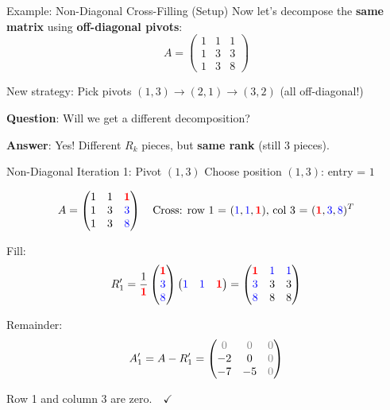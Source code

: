 \documentclass[10pt]{beamer}
\theoremstyle{definition}
\newcommand{\pvt}[1]{{\color{red}\mathbf{#1}}}       %
\newcommand{\crs}[1]{{\color{blue}#1}}                %
\newcommand{\rem}[1]{{\color{gray}#1}}                %
\newcommand{\x}[1]{\alert{\textbf{#1}}}
\begin{document}
\begin{frame}{Example: Non-Diagonal Cross-Filling (Setup)}
Now let's decompose the \x{same matrix} using \x{off-diagonal pivots}:
$$A = \begin{pmatrix}
1 & 1 & 1 \\
1 & 3 & 3 \\
1 & 3 & 8
\end{pmatrix}$$

\vfill
New strategy: Pick pivots $(1,3) \to (2,1) \to (3,2)$ (all off-diagonal!)

\vfill
\textbf{Question}: Will we get a different decomposition?

\vfill
\textbf{Answer}: Yes! Different $R_k$ pieces, but \x{same rank} (still 3 pieces).
\end{frame}

\begin{frame}{Non-Diagonal Iteration 1: Pivot $(1,3)$}
Choose position $(1,3)$: entry = $1$

$$A = \begin{pmatrix}
1 & 1 & \pvt{1} \\
1 & 3 & \crs{3} \\
1 & 3 & \crs{8}
\end{pmatrix}
\quad
\text{Cross: row 1 = $(\crs{1}, \crs{1}, \pvt{1})$, col 3 = $(\pvt{1}, \crs{3}, \crs{8})^T$}
$$

\vfill
Fill:
$$R_1' = \frac{1}{\pvt{1}}
\begin{pmatrix} \pvt{1} \\ \crs{3} \\ \crs{8} \end{pmatrix}
\begin{pmatrix} \crs{1} & \crs{1} & \pvt{1} \end{pmatrix}
= \begin{pmatrix}
\pvt{1} & \crs{1} & \crs{1} \\
\crs{3} & 3 & 3 \\
\crs{8} & 8 & 8
\end{pmatrix}$$

\vfill
Remainder:
$$A_1' = A - R_1' = \begin{pmatrix}
\rem{0} & \rem{0} & \rem{0} \\
-2 & 0 & \rem{0} \\
-7 & -5 & \rem{0}
\end{pmatrix}$$

Row 1 and column 3 are \rem{zero}.\ \ $\checkmark$
\end{frame}
\end{document}
